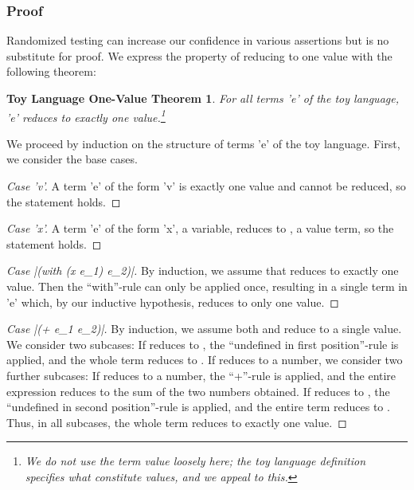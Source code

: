\subsubsection{Proof}

Randomized testing can increase our confidence in various assertions but is no substitute 
for proof. We express the property of reducing to one value with the following theorem:

\newtheorem*{toythm}{Toy Language One-Value Theorem}
\begin{toythm}
For all terms \scheme'e' of the toy language, \scheme'e' reduces to exactly one
value.\footnote{We do not use the term \emph{value} loosely here; the toy language
definition specifies what constitute values, and we appeal to this.}
\end{toythm}
We proceed by induction on the structure of terms \scheme'e' of the toy language. First,
we consider the base cases.
\begin{proof}[Case \scheme'v']
A term \scheme'e' of the form \scheme'v' is exactly one value and cannot be reduced, 
so the statement holds.
\end{proof}
\begin{proof}[Case \scheme'x']
A term \scheme'e' of the form \scheme'x', a variable, reduces to , 
a value term, so the statement holds.
\end{proof}
\begin{proof}[Case \scheme|(with (x e_1) e_2)|]
By induction, we assume that  reduces to exactly one value. Then the
``with''-rule can only be applied once, resulting in a single term  in
\scheme'e' which, by our inductive hypothesis, reduces to only one value.
\end{proof}
\begin{proof}[Case \scheme|(+ e_1 e_2)|]
By induction, we assume both  and  reduce to a single value. We
consider two subcases: If  reduces to , the ``undefined in
first position''-rule is applied, and the whole term reduces to . If
 reduces to a number, we consider two further subcases: If 
reduces to a number, the ``+''-rule is applied, and the entire expression reduces to the
sum of the two numbers obtained. If  reduces to , the
``undefined in second position''-rule is applied, and the entire term reduces to
. Thus, in all subcases, the whole term reduces to exactly one value.
\end{proof}


